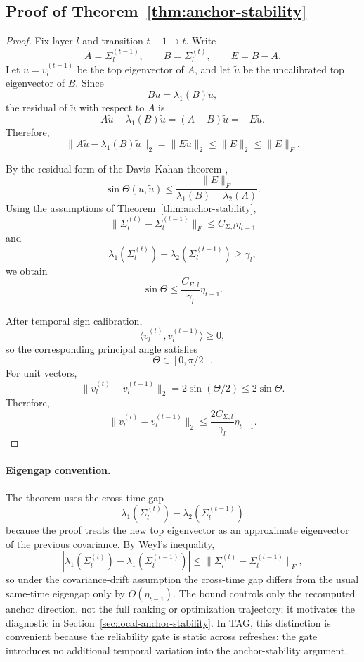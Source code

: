 \subsection{Proof of Theorem~\ref{thm:anchor-stability}}
\label{app:proof-stability}
\begin{proof}
Fix layer \(l\) and transition \(t-1\to t\). Write
\[
A=\Sigma_l^{(t-1)},\qquad
B=\Sigma_l^{(t)},\qquad
E=B-A .
\]
Let \(u=v_l^{(t-1)}\) be the top eigenvector of \(A\), and let
\(\tilde u\) be the uncalibrated top eigenvector of \(B\). Since
\[
B\tilde u=\lambda_1(B)\tilde u,
\]
the residual of \(\tilde u\) with respect to \(A\) is
\[
A\tilde u-\lambda_1(B)\tilde u
=
(A-B)\tilde u
=
-E\tilde u.
\]
Therefore,
\[
\|A\tilde u-\lambda_1(B)\tilde u\|_2
=
\|E\tilde u\|_2
\le
\|E\|_2
\le
\|E\|_F .
\]

By the residual form of the Davis--Kahan theorem
\cite{davis1970rotation,stewart1990matrix},
\[
\sin\Theta(u,\tilde u)
\le
\frac{\|E\|_F}
{\lambda_1(B)-\lambda_2(A)} .
\]
Using the assumptions of Theorem~\ref{thm:anchor-stability},
\[
\|\Sigma_l^{(t)}-\Sigma_l^{(t-1)}\|_F
\le
C_{\Sigma,l}\eta_{t-1}
\]
and
\[
\lambda_1(\Sigma_l^{(t)})
-
\lambda_2(\Sigma_l^{(t-1)})
\ge
\gamma_l,
\]
we obtain
\[
\sin\Theta
\le
\frac{C_{\Sigma,l}}{\gamma_l}\eta_{t-1}.
\]

After temporal sign calibration,
\[
\langle v_l^{(t)},v_l^{(t-1)}\rangle\ge0,
\]
so the corresponding principal angle satisfies
\[
\Theta\in[0,\pi/2].
\]
For unit vectors,
\[
\|v_l^{(t)}-v_l^{(t-1)}\|_2
=
2\sin(\Theta/2)
\le
2\sin\Theta .
\]
Therefore,
\[
\boxed{
\|v_l^{(t)}-v_l^{(t-1)}\|_2
\le
\frac{2C_{\Sigma,l}}{\gamma_l}\eta_{t-1}
}.
\]
\end{proof}

\paragraph{Eigengap convention.}
The theorem uses the cross-time gap
\[
\lambda_1(\Sigma_l^{(t)})
-
\lambda_2(\Sigma_l^{(t-1)})
\]
because the proof treats the new top eigenvector as an approximate
eigenvector of the previous covariance. By Weyl's inequality,
\[
\left|
\lambda_1(\Sigma_l^{(t)})
-
\lambda_1(\Sigma_l^{(t-1)})
\right|
\le
\|\Sigma_l^{(t)}-\Sigma_l^{(t-1)}\|_F ,
\]
so under the covariance-drift assumption the cross-time gap differs
from the usual same-time eigengap only by \(O(\eta_{t-1})\).
The bound controls only the recomputed anchor direction, not the full
ranking or optimization trajectory; it motivates the diagnostic in
Section~\ref{sec:local-anchor-stability}. In \textsc{TAG}, this
distinction is convenient because the reliability gate is static
across refreshes: the gate introduces no additional temporal
variation into the anchor-stability argument.

